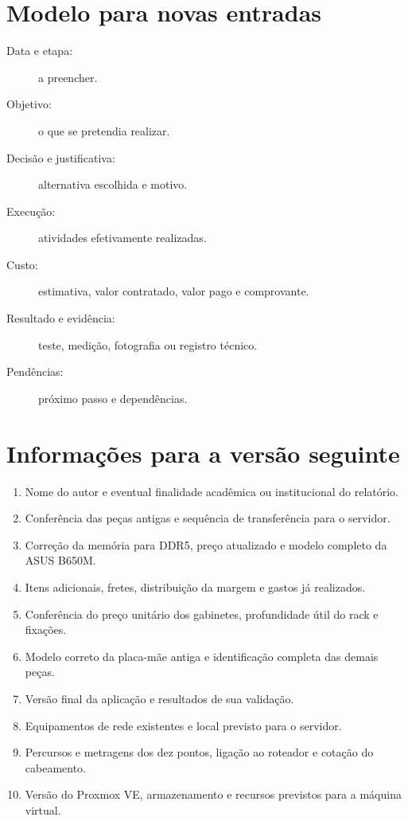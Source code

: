 \documentclass[11pt,a4paper,oneside]{report}
\begin{document}
\section{Modelo para novas entradas}
\begin{description}
\item[Data e etapa:] a preencher.
\item[Objetivo:] o que se pretendia realizar.
\item[Decisão e justificativa:] alternativa escolhida e motivo.
\item[Execução:] atividades efetivamente realizadas.
\item[Custo:] estimativa, valor contratado, valor pago e comprovante.
\item[Resultado e evidência:] teste, medição, fotografia ou registro técnico.
\item[Pendências:] próximo passo e dependências.
\end{description}

\section{Informações para a versão seguinte}
\begin{enumerate}
\item Nome do autor e eventual finalidade acadêmica ou institucional do relatório.
\item Conferência das peças antigas e sequência de transferência para o servidor.
\item Correção da memória para DDR5, preço atualizado e modelo completo da ASUS B650M.
\item Itens adicionais, fretes, distribuição da margem e gastos já realizados.
\item Conferência do preço unitário dos gabinetes, profundidade útil do rack e fixações.
\item Modelo correto da placa-mãe antiga e identificação completa das demais peças.
\item Versão final da aplicação e resultados de sua validação.
\item Equipamentos de rede existentes e local previsto para o servidor.
\item Percursos e metragens dos dez pontos, ligação ao roteador e cotação do cabeamento.
\item Versão do Proxmox VE, armazenamento e recursos previstos para a máquina virtual.
\end{enumerate}
\end{document}
